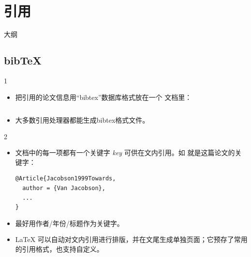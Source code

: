 \documentclass{beamer}
\begin{document}
\section{引用}

\begin{frame}{大纲}
\begin{multicols}{2}
\tableofcontents[currentsection]
\end{multicols}
\end{frame}

\subsection{bib\TeX}
\begin{frame}[fragile]{\insertsubsection{} 1}
\begin{itemize}
\item 把引用的论文信息用“bibtex”数据库格式放在一个  文档里：
\inputminted[fontsize=\scriptsize,frame=single]{latex}{bib-example.bib}
\item 大多数引用处理器都能生成bibtex格式文件。
\end{itemize}
\end{frame}

\begin{frame}[fragile]{\insertsubsection{} 2}
\begin{itemize}
\item {} 文档中的每一项都有一个关键字 \emph{key} 可供在文内引用。如  就是这篇论文的关键字：
\begin{verbatim}
@Article{Jacobson1999Towards,
  author = {Van Jacobson},
  ...
}
\end{verbatim}
\item 最好用作者/年份/标题作为关键字。
\item \LaTeX{} 可以自动对文内引用进行排版，并在文尾生成单独页面；它预存了常用的引用格式，也支持自定义。
\end{itemize}
\end{frame}
\end{document}

